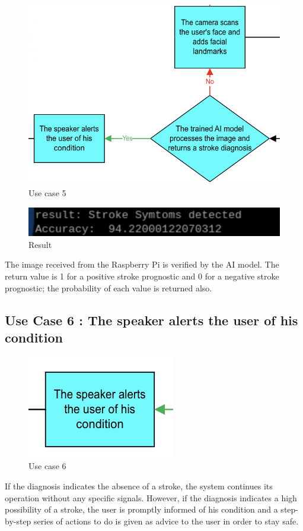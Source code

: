 \begin{figure}[H]
    \centering
    \includegraphics[width=0.7\linewidth]{images/use_case5.png}
    \caption{Use case 5}
    \label{fig:use_case5}
\end{figure}

\begin{figure}[H]
    \centering
    \includegraphics[width=1\linewidth]{images/Result.png}
    \caption{Result}
    \label{fig:result}
\end{figure}

The image received from the Raspberry Pi is verified by the AI model. The return value is 1 for a positive stroke prognostic and 0 for a negative stroke prognostic; the probability of each value is returned also.

\subsection{\textbf{Use Case 6 : The speaker alerts the user of his condition}}

\begin{figure}[H]
    \centering
    \includegraphics[width=0.33\linewidth]{images/use_case6.png}
    \caption{Use case 6}
    \label{fig:use_case6}
\end{figure}

If the diagnosis indicates the absence of a stroke, the system continues its operation without any specific signals. However, if the diagnosis indicates a high possibility of a stroke, the user is promptly informed of his condition and a step-by-step series of actions to do is given as advice to the user in order to stay safe.